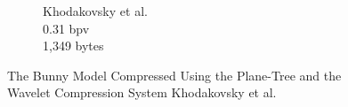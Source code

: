 \begin{figure}[!htb]
\begin{center}
\begin{subfigure}[b]{6cm}
                \captionsetup{justification=centering}
                \caption{Khodakovsky et al. \cite{Khodakovsky00Progressive}\\0.31 bpv\\1,349 bytes}
                \label{fig:PT_SOTAQ1_KHKY}
        \end{subfigure}
       \caption{The Bunny Model Compressed Using the Plane-Tree and the Wavelet Compression System Khodakovsky et al.}
       \label{fig:qualSOTA2}
       \end{center}
\end{figure}

